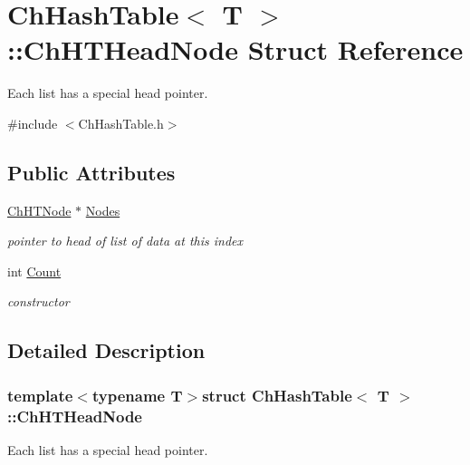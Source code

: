 \hypertarget{structChHashTable_1_1ChHTHeadNode}{\section{Ch\-Hash\-Table$<$ T $>$\-:\-:Ch\-H\-T\-Head\-Node Struct Reference}
\label{structChHashTable_1_1ChHTHeadNode}
}


Each list has a special head pointer.  




{\ttfamily \#include $<$Ch\-Hash\-Table.\-h$>$}

\subsection*{Public Attributes}
\begin{DoxyCompactItemize}
\item 
\hypertarget{structChHashTable_1_1ChHTHeadNode_a97d46c5dd7f7cd72cab5cec59be0e271}{\hyperlink{structChHashTable_1_1ChHTNode}{Ch\-H\-T\-Node} $\ast$ \hyperlink{structChHashTable_1_1ChHTHeadNode_a97d46c5dd7f7cd72cab5cec59be0e271}{Nodes}}\label{structChHashTable_1_1ChHTHeadNode_a97d46c5dd7f7cd72cab5cec59be0e271}

\begin{DoxyCompactList}\small\item\em pointer to head of list of data at this index \end{DoxyCompactList}\item 
int \hyperlink{structChHashTable_1_1ChHTHeadNode_a2e06f4036a3fedc180c24597e407d257}{Count}
\begin{DoxyCompactList}\small\item\em constructor \end{DoxyCompactList}\end{DoxyCompactItemize}


\subsection{Detailed Description}
\subsubsection*{template$<$typename T$>$struct Ch\-Hash\-Table$<$ T $>$\-::\-Ch\-H\-T\-Head\-Node}

Each list has a special head pointer. 

